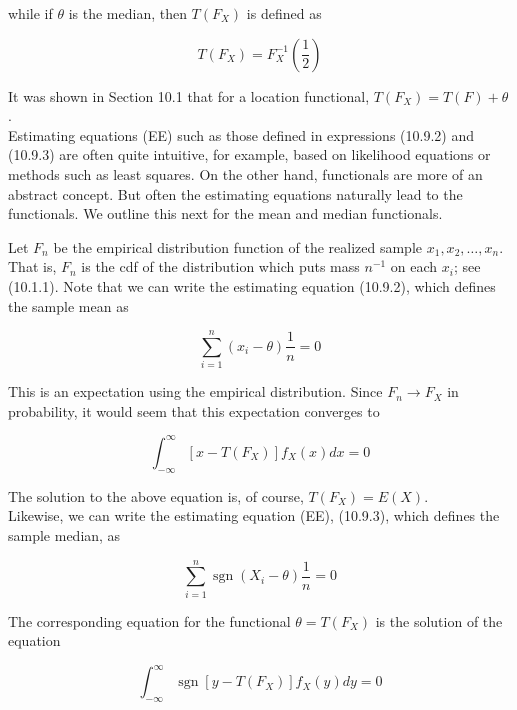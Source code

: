 while if $\theta$ is the median, then $T\left(F_{X}\right)$ is defined as


\begin{equation*}
T\left(F_{X}\right)=F_{X}^{-1}\left(\frac{1}{2}\right) \tag{10.9.8}
\end{equation*}


It was shown in Section 10.1 that for a location functional, $T\left(F_{X}\right)=T(F)+\theta$.\\
Estimating equations (EE) such as those defined in expressions (10.9.2) and (10.9.3) are often quite intuitive, for example, based on likelihood equations or methods such as least squares. On the other hand, functionals are more of an abstract concept. But often the estimating equations naturally lead to the functionals. We outline this next for the mean and median functionals.

Let $F_{n}$ be the empirical distribution function of the realized sample $x_{1}, x_{2}, \ldots, x_{n}$. That is, $F_{n}$ is the cdf of the distribution which puts mass $n^{-1}$ on each $x_{i}$; see (10.1.1). Note that we can write the estimating equation (10.9.2), which defines the sample mean as


\begin{equation*}
\sum_{i=1}^{n}\left(x_{i}-\theta\right) \frac{1}{n}=0 \tag{10.9.9}
\end{equation*}


This is an expectation using the empirical distribution. Since $F_{n} \rightarrow F_{X}$ in probability, it would seem that this expectation converges to


\begin{equation*}
\int_{-\infty}^{\infty}\left[x-T\left(F_{X}\right)\right] f_{X}(x) d x=0 \tag{10.9.10}
\end{equation*}


The solution to the above equation is, of course, $T\left(F_{X}\right)=E(X)$.\\
Likewise, we can write the estimating equation (EE), (10.9.3), which defines the sample median, as


\begin{equation*}
\sum_{i=1}^{n} \operatorname{sgn}\left(X_{i}-\theta\right) \frac{1}{n}=0 \tag{10.9.11}
\end{equation*}


The corresponding equation for the functional $\theta=T\left(F_{X}\right)$ is the solution of the equation


\begin{equation*}
\int_{-\infty}^{\infty} \operatorname{sgn}\left[y-T\left(F_{X}\right)\right] f_{X}(y) d y=0 \tag{10.9.12}
\end{equation*}


